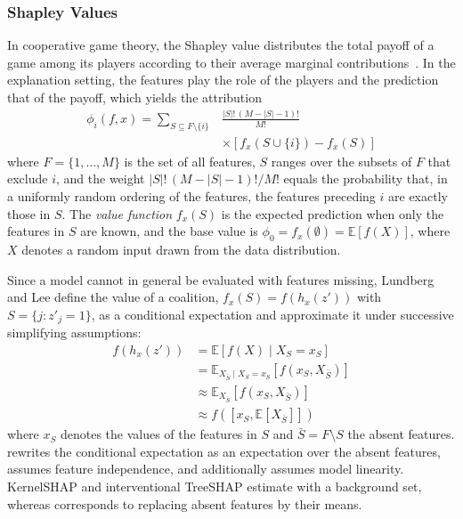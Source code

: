     \subsubsection{Shapley Values}
    In cooperative game theory, the Shapley value distributes the total payoff of a game among its players according to their average marginal contributions~\cite{shapley1953value}. In the explanation setting, the features play the role of the players and the prediction that of the payoff, which yields the attribution
    \begin{equation}
        \begin{split}
            \phi_i(f, x) = \sum_{S \subseteq F \setminus \{i\}} & \frac{|S|!\,(M - |S| - 1)!}{M!} \\
            & \times \left[ f_x(S \cup \{i\}) - f_x(S) \right]
        \end{split}
        \label{eq:shapley-formula}
    \end{equation}
    where $F = \{1, \dots, M\}$ is the set of all features, $S$ ranges over the subsets of $F$ that exclude $i$, and the weight $|S|!\,(M - |S| - 1)!/M!$ equals the probability that, in a uniformly random ordering of the features, the features preceding $i$ are exactly those in $S$. The \textit{value function} $f_x(S)$ is the expected prediction when only the features in $S$ are known, and the base value is $\phi_0 = f_x(\emptyset) = \mathbb{E}[f(X)]$, where $X$ denotes a random input drawn from the data distribution.

    Since a model cannot in general be evaluated with features missing, Lundberg and Lee define the value of a coalition, $f_x(S) = f(h_x(z'))$ with $S = \{ j : z'_j = 1 \}$, as a conditional expectation and approximate it under successive simplifying assumptions:
    \begin{align}
        f(h_x(z')) &= \mathbb{E}[f(X) \mid X_S = x_S] \label{eq:approx-cond} \\
        &= \mathbb{E}_{X_{\bar{S}} \mid X_S = x_S}\left[ f(x_S, X_{\bar{S}}) \right] \label{eq:approx-marginal} \\
        &\approx \mathbb{E}_{X_{\bar{S}}}\left[ f(x_S, X_{\bar{S}}) \right] \label{eq:approx-indep} \\
        &\approx f\left( \left[ x_S, \mathbb{E}[X_{\bar{S}}] \right] \right) \label{eq:approx-lin}
    \end{align}
    where $x_S$ denotes the values of the features in $S$ and $\bar{S} = F \setminus S$ the absent features.  rewrites the conditional expectation as an expectation over the absent features,  assumes feature independence, and  additionally assumes model linearity. KernelSHAP and interventional TreeSHAP estimate  with a background set, whereas  corresponds to replacing absent features by their means.

